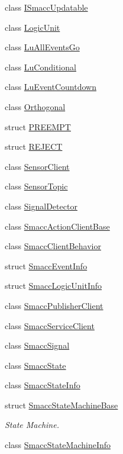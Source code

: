 \begin{DoxyCompactItemize}
class \hyperlink{classsmacc_1_1ISmaccUpdatable}{I\+Smacc\+Updatable}
\item 
class \hyperlink{classsmacc_1_1LogicUnit}{Logic\+Unit}
\item 
class \hyperlink{classsmacc_1_1LuAllEventsGo}{Lu\+All\+Events\+Go}
\item 
class \hyperlink{classsmacc_1_1LuConditional}{Lu\+Conditional}
\item 
class \hyperlink{classsmacc_1_1LuEventCountdown}{Lu\+Event\+Countdown}
\item 
class \hyperlink{classsmacc_1_1Orthogonal}{Orthogonal}
\item 
struct \hyperlink{structsmacc_1_1PREEMPT}{P\+R\+E\+E\+M\+PT}
\item 
struct \hyperlink{structsmacc_1_1REJECT}{R\+E\+J\+E\+CT}
\item 
class \hyperlink{classsmacc_1_1SensorClient}{Sensor\+Client}
\item 
class \hyperlink{classsmacc_1_1SensorTopic}{Sensor\+Topic}
\item 
class \hyperlink{classsmacc_1_1SignalDetector}{Signal\+Detector}
\item 
class \hyperlink{classsmacc_1_1SmaccActionClientBase}{Smacc\+Action\+Client\+Base}
\item 
class \hyperlink{classsmacc_1_1SmaccClientBehavior}{Smacc\+Client\+Behavior}
\item 
struct \hyperlink{structsmacc_1_1SmaccEventInfo}{Smacc\+Event\+Info}
\item 
struct \hyperlink{structsmacc_1_1SmaccLogicUnitInfo}{Smacc\+Logic\+Unit\+Info}
\item 
class \hyperlink{classsmacc_1_1SmaccPublisherClient}{Smacc\+Publisher\+Client}
\item 
class \hyperlink{classsmacc_1_1SmaccServiceClient}{Smacc\+Service\+Client}
\item 
class \hyperlink{classsmacc_1_1SmaccSignal}{Smacc\+Signal}
\item 
class \hyperlink{classsmacc_1_1SmaccState}{Smacc\+State}
\item 
class \hyperlink{classsmacc_1_1SmaccStateInfo}{Smacc\+State\+Info}
\item 
struct \hyperlink{structsmacc_1_1SmaccStateMachineBase}{Smacc\+State\+Machine\+Base}
\begin{DoxyCompactList}\small\item\em State Machine. \end{DoxyCompactList}\item 
class \hyperlink{classsmacc_1_1SmaccStateMachineInfo}{Smacc\+State\+Machine\+Info}

\end{DoxyCompactItemize}
